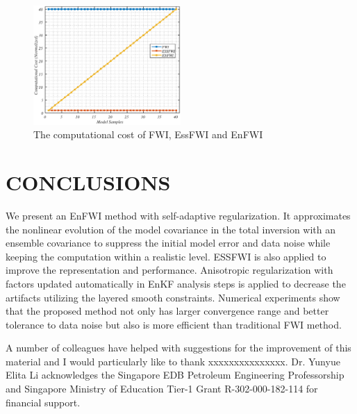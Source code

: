 \documentclass[mreferee]{gji}
\begin{document}
\begin{figure}
\center
\includegraphics[width=0.5\textwidth]{fig/performance.eps}
\caption{The computational cost of FWI, EssFWI and EnFWI}
\label{fig:performance}
\end{figure}

\section{CONCLUSIONS}

We present an EnFWI method with self-adaptive regularization. It approximates the nonlinear evolution of the model covariance in the total inversion with an ensemble covariance to suppress the initial model error and data noise while keeping the computation within a realistic level. ESSFWI is also applied to improve the representation and performance. Anisotropic regularization with factors updated automatically in EnKF analysis steps is applied to decrease the artifacts utilizing the layered smooth constraints. Numerical experiments show that the proposed method not only has larger convergence range and better tolerance to data noise but also is more efficient than traditional FWI method.


\begin{acknowledgments}
A number of colleagues have helped with suggestions for the improvement of this material and I would particularly like to thank xxxxxxxxxxxxxxx. Dr. Yunyue Elita Li acknowledges the Singapore EDB Petroleum Engineering Professorship and Singapore Ministry of Education Tier-1 Grant R-302-000-182-114 for financial support.
\end{acknowledgments}
\end{document}
